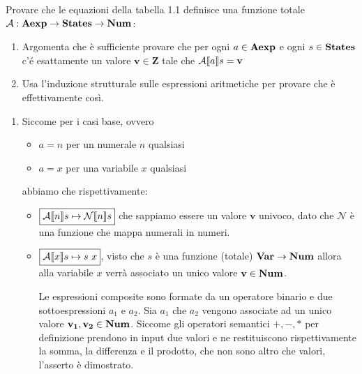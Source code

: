 {Provare che le equazioni della tabella 1.1 definisce una funzione totale $\mathcal{A}:\mbox{\textbf{Aexp}} \rightarrow \mbox{\textbf{States}} \rightarrow \mbox{\textbf{Num}}$: 
	\begin{enumerate}
		\item Argomenta che è sufficiente provare che per ogni $a \in \mbox{\textbf{Aexp}}$ e ogni $s \in \mbox{\textbf{States}}$
		c'é esattamente un valore $\mathbf{v} \in \mathbf{Z}$ tale che $\mathcal{A} \llbracket a \rrbracket s = \mathbf{v}$
		\item Usa l'induzione strutturale sulle espressioni aritmetiche per provare che è effettivamente
		così.
	\end{enumerate}
}
{
	\begin{enumerate}
		\item Siccome per i casi base, ovvero
		\begin{itemize}
			\item $\boxed{a = n}$ per un numerale $n$ qualsiasi
			\item $\boxed{a = x}$ per una variabile $x$ qualsiasi
		\end{itemize} 
		abbiamo che rispettivamente:
		\begin{itemize}
			\item $\boxed{\mathcal{A} \llbracket n \rrbracket s \mapsto \mathcal{N} \llbracket n \rrbracket s}$ che sappiamo essere un valore $\mathbf{v}$ univoco, dato che $\mathcal{N}$ è una funzione che mappa numerali in numeri.
			\item $\boxed{\mathcal{A} \llbracket x \rrbracket s \mapsto s\mbox{ } x}$, visto che $s$ è una funzione (totale) $\mbox{\textbf{Var}} \rightarrow \mbox{\textbf{Num}}$  allora
			alla variabile $x$ verrà associato un unico valore $\mathbf{v} \in \mbox{\textbf{Num}}$.
			
			Le espressioni composite sono formate da un operatore binario e due sottoespressioni
			$a_1$ e $a_2$.
			Sia $a_1$ che $a_2$ vengono associate ad un unico valore $\mathbf{v_1}, \mathbf{v_2} \in \mbox{\textbf{Num}}$.
			Siccome gli operatori semantici $+, -, *$ per definizione prendono in input due
			valori e ne restituiscono rispettivamente la somma, la differenza e il prodotto, che
			non sono altro che valori, l'asserto è dimostrato.
		

\end{itemize}
\end{enumerate}}
